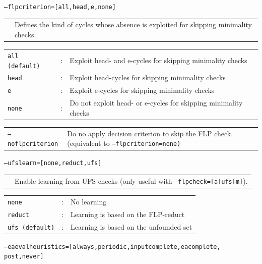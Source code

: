 \documentclass[14pt,a4paper, titlepage]{article}
\begin{document}
\bigskip
\texttt{--flpcriterion=[all,head,e,none]}
\begin{center}
\begin{tabular}{p{3cm}  p{7.8cm}} 
 & Defines the kind of cycles whose absence is exploited for skipping minimality checks.\\
\end{tabular}
\end{center}
\begin{center}
\begin{tabular}{p{2.5cm}  p{0.5cm} p{7.8cm}  } 
\texttt{all (default)}&:&Exploit head- and e-cycles for skipping minimality checks\\
\texttt{head} &:& Exploit head-cycles for skipping minimality checks\\
\texttt{e}&:&Exploit e-cycles for skipping minimality checks\\
\texttt{none} &:& Do not exploit head- or e-cycles for skipping minimality checks\\
\end{tabular}
\end{center}
\begin{center}
\begin{tabular}{p{3cm}  p{7.8cm}}
\texttt{--noflpcriterion}& Do no apply decision criterion to skip the FLP check. (equivalent to \texttt{--flpcriterion=none)}\\
\end{tabular}
\end{center}
\bigskip
\texttt{--ufslearn=[none,reduct,ufs]}
\begin{center}
\begin{tabular}{p{3cm}  p{7.8cm}} 
 & Enable learning from UFS checks (only useful with 
\texttt{--flpcheck=[a]ufs[m]}).\\
\end{tabular}
\end{center}
\begin{center}
\begin{tabular}{p{2.5cm}  p{0.5cm} p{7.8cm}  } 
\texttt{none}&:&No learning\\
\texttt{reduct}&:&Learning is based on the FLP-reduct\\
\texttt{ufs (default)}&:&Learning is based on the unfounded set\\
\end{tabular}
\end{center}
\bigskip
\texttt{--eaevalheuristics=[always,periodic,inputcomplete,eacomplete,
\\post,never]}
\end{document}

